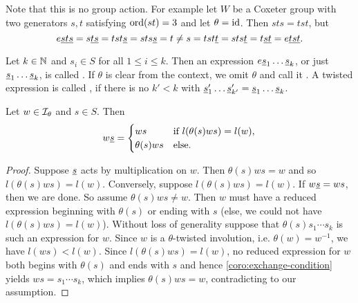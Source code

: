 Note that this is no group action. For example let $W$ be a Coxeter group with two generators $s,t$ satisfying $\operatorname{ord}(st) = 3$ and let $\theta = \operatorname{id}$. Then $sts = tst$, but
$$ e \underline{s} \underline{t} \underline{s} = s \underline{t} \underline{s} = tst \underline{s} = sts \underline{s} = t \neq s = tst \underline{t} = sts \underline{t} = t \underline{s} \underline{t} = e \underline{t} \underline{s} \underline{t}. $$

\begin{defi}
	Let $k \in \mathbb{N}$ and $s_{i} \in S$ for all $1 \leq i \leq k$. Then an expression $e \underline{s}_1 \ldots \underline{s}_k$, or just $\underline{s}_1 \ldots \underline{s}_k$, is called . If $\theta$ is clear from the context, we omit $\theta$ and call it . A twisted expression is called , if there is no $k' < k$ with $\underline{s}'_1 \ldots \underline{s}'_{k'} = \underline{s}_1 \ldots \underline{s}_k$.
\end{defi}

\begin{lemm}
	Let $w \in \mathcal{I}_{\theta}$ and $s \in S$. Then
	$$ w \underline{s} = \begin{cases}
		ws & \textrm{if } l(\theta(s)ws) = l(w), \\
		\theta(s)ws & \textrm{else}. \\
	\end{cases} $$

	\begin{proof}
		Suppose $\underline{s}$ acts by multiplication on $w$. Then $\theta(s)ws = w$ and so $l(\theta(s)ws) = l(w)$. Conversely, suppose $l(\theta(s)ws) = l(w)$. If $w \underline{s} = ws$, then we are done. So assume $\theta(s)ws \neq w$. Then $w$ must have a reduced expression beginning with $\theta(s)$ or ending with $s$ (else, we could not have $l(\theta(s)ws) = l(w)$). Without loss of generality suppose that $\theta(s)s_1 \cdots s_k$ is such an expression for $w$. Since $w$ is a $\theta$-twisted involution, i.e. $\theta(w) = w^{-1}$, we have $l(ws) < l(w)$. Since $l(\theta(s)ws) = l(w)$, no reduced expression for $w$ both begins with $\theta(s)$ and ends with $s$ and hence \ref{coro:exchange-condition} yields $ws = s_1 \cdots s_k$, which implies $\theta(s)ws = w$, contradicting to our assumption.
	\end{proof}
\end{lemm}

